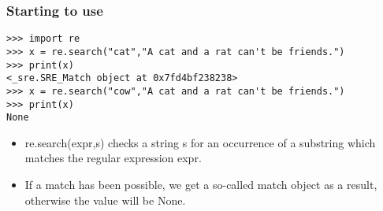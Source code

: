  \begin{frame}[fragile]
\frametitle{Starting to use}


\begin{lstlisting}
>>> import re
>>> x = re.search("cat","A cat and a rat can't be friends.")
>>> print(x)
<_sre.SRE_Match object at 0x7fd4bf238238>
>>> x = re.search("cow","A cat and a rat can't be friends.")
>>> print(x)
None
\end{lstlisting}
\begin{itemize}
\item re.search(expr,s) checks a string s for an occurrence of a substring which matches the regular expression expr.
\item If a match has been possible, we get a so-called match object as a result, otherwise the value will be None.
\end{itemize}
\end{frame}

